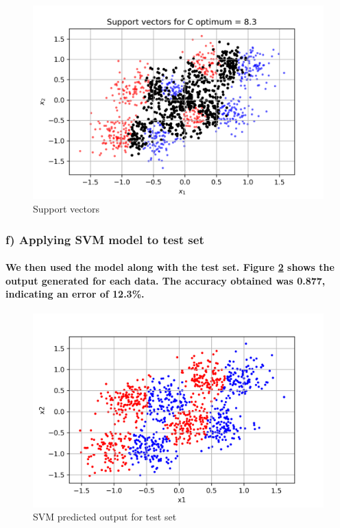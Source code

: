\documentclass[a4paper]{article}    %
\begin{document}
\begin{figure}[H]
    \centering
    \includegraphics[width=12cm]{support_vectors}
    \caption{Support vectors}
    \label{fig:svm-support_vectors}
\end{figure}

\subsubsection{f) Applying SVM model to test set}

\paragraph{We then used the model along with the test set. Figure \ref{fig:svm-test_set_output} shows the output generated for each data. The accuracy obtained was 0.877, indicating an error of 12.3\%.}

\begin{figure}[H]
    \centering
    \includegraphics[width=12cm]{svm_test_set_output}
    \caption{SVM predicted output for test set}
    \label{fig:svm-test_set_output}
\end{figure}
\end{document}

